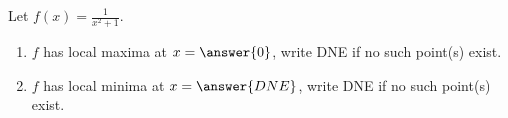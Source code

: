 \documentclass{ximera}
\author{Gregory Hartman \and Matthew Carr}
\begin{document}
\begin{exercise}






Let $f(x)=\frac{1}{x^2+1}$.
\begin{enumerate}
\item		$f$ has local maxima at $x=\answer{0}$, write DNE if no such point(s) exist.
\item		$f$ has local minima at $x=\answer{DNE}$, write DNE if no such point(s) exist.
\end{enumerate}

\end{exercise}
\end{document}
